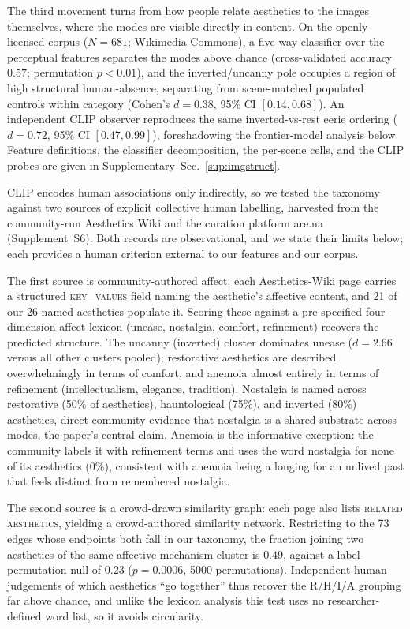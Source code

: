 \documentclass[11pt]{article}
\begin{document}
The third movement turns from how people relate aesthetics to the images themselves, where the
modes are visible directly in content. On the openly-licensed corpus
($N=681$; Wikimedia Commons), a five-way classifier over the perceptual features separates
the modes above chance (cross-validated accuracy $0.57$; permutation $p<0.01$), and the
inverted/uncanny pole occupies a region of high structural human-absence, separating from
scene-matched populated controls within category (Cohen's $d=0.38$, 95\% CI $[0.14,0.68]$).
An independent CLIP observer reproduces the same inverted-vs-rest eerie ordering ($d=0.72$,
95\% CI $[0.47,0.99]$), foreshadowing the frontier-model analysis below. Feature definitions,
the classifier decomposition, the per-scene cells, and the CLIP probes are given in
Supplementary~Sec.~\ref{sup:imgstruct}.


CLIP encodes human associations only indirectly, so we tested the taxonomy against two
sources of explicit collective human labelling, harvested from the community-run Aesthetics
Wiki and the curation platform are.na (Supplement~S6). Both records are observational, and we state
their limits below; each provides a human criterion external to our features and our corpus.

The first source is community-authored affect: each Aesthetics-Wiki page carries a structured
\textsc{key\_values} field naming the aesthetic's affective content, and 21 of our 26 named aesthetics
populate it. Scoring these against a pre-specified four-dimension affect lexicon (unease,
nostalgia, comfort, refinement) recovers the predicted structure. The uncanny (inverted) cluster
dominates unease ($d=2.66$ versus all other clusters pooled); restorative aesthetics are
described overwhelmingly in terms of comfort, and anemoia almost entirely in terms of
refinement (intellectualism, elegance, tradition). Nostalgia is named across
restorative (50\% of aesthetics), hauntological (75\%), and inverted (80\%) aesthetics, direct
community evidence that nostalgia is a shared substrate across modes, the paper's central claim.
Anemoia is the informative exception: the community labels it with refinement terms and uses the
word nostalgia for none of its aesthetics (0\%), consistent with anemoia being a longing for an
unlived past that feels distinct from remembered nostalgia.

The second source is a crowd-drawn similarity graph: each page also lists \textsc{related
aesthetics}, yielding a crowd-authored similarity network. Restricting to the 73 edges
whose endpoints both fall in our taxonomy, the fraction joining two aesthetics of the
same affective-mechanism cluster is $0.49$, against a label-permutation null of
$0.23$ ($p=0.0006$, 5000 permutations). Independent human judgements of which aesthetics
``go together'' thus recover the R/H/I/A grouping far above chance, and unlike the lexicon
analysis this test uses no researcher-defined word list, so it avoids circularity.
\end{document}
